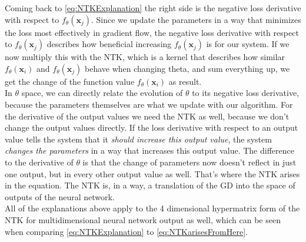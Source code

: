 Coming back to \cref{eq:NTKExplanation} the right side is the negative loss derivative with respect to $f_\theta(\mathbf{x}_j)$. Since we update the parameters in a way that minimizes the loss most effectively in gradient flow, the negative loss derivative with respect to $f_\theta(\mathbf{x}_j)$ describes how beneficial increasing $f_\theta(\mathbf{x}_j)$ is for our system. If we now multiply this with the NTK, which is a kernel that describes how similar $f_\theta(\mathbf{x}_i)$ and $f_\theta(\mathbf{x}_j)$ behave when changing theta, and sum everything up, we get the change of the function value $f_\theta(\mathbf{x}_i)$ as result.\\
In $\theta$ space, we can directly relate the evolution of $\theta$ to its negative loss derivative, because the parameters themselves are what we update with our algorithm. For the derivative of the output values we need the NTK as well, because we don't change the output values directly. If the loss derivative with respect to an output value tells the system that it \textit{should increase this output value}, the system \textit{changes the parameters} in a way that increases this output value. The difference to the derivative of $\theta$ is that the change of parameters now doesn't reflect in just one output, but in every other output value as well. That's where the NTK arises in the equation. The NTK is, in a way, a translation of the GD into the space of outputs of the neural network.\\
All of the explanations above apply to the 4 dimensional hypermatrix form of the NTK for multidimensional neural network output as well, which can be seen when comparing \cref{eq:NTKExplanation} to \cref{eq:NTKarisesFromHere}.